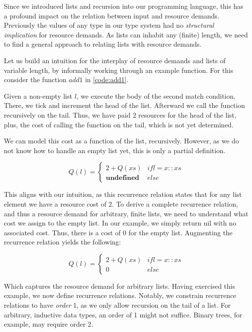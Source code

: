 Since we introduced lists and recursion into our programming language, this has a profound impact on the relation between input and resource demands. Previously the values of any type in our type system had no \emph{structural implication} for resource demands. As lists can inhabit any (finite) length, we need to find a general approach to relating lists with resource demands. 

Let us build an intuition for the interplay of resource demands and lists of variable length, by informally working through an example function. For this consider the function \(add1\) in \cref{code:add1}.

Given a non-empty list \(l\), we execute the body of the second match condition. There, we tick and increment the head of the list. Afterward we call the function recursively on the tail. Thus, we have paid \(2\) resources for the head of the list, plus, the cost of calling the function on the tail, which is not yet determined.

We can model this cost as a function of the list, recursively. However, as we do not know how to handle an empty list yet, this is only a partial definition.

\[
   Q(l) = \begin{cases*}
      2 + Q(xs)            & if l = x :: xs\\
      \textbf{undefined}   & else
   \end{cases*}
\]

This aligns with our intuition, as this recurrence relation states that for any list element we have a resource cost of \(2\). To derive a complete recurrence relation, and thus a resource demand for arbitrary, finite lists, we need to understand what cost we assign to the empty list. In our example, we simply return nil with no associated cost. Thus, there is a cost of \(0\) for the empty list. Augmenting the recurrence relation yields the following:

\[
   Q(l) = \begin{cases*}
      2 + Q(xs)            & if l = x :: xs\\
      0                    & else
   \end{cases*}
\]

Which captures the resource demand for arbitrary lists. Having exercised this example, we now define recurrence relations. Notably, we constrain recurrence relations to have \emph{order} 1, as we only allow recursion on the tail of a list. For arbitrary, inductive data types, an order of 1 might not suffice. Binary trees, for example, may require order 2.

